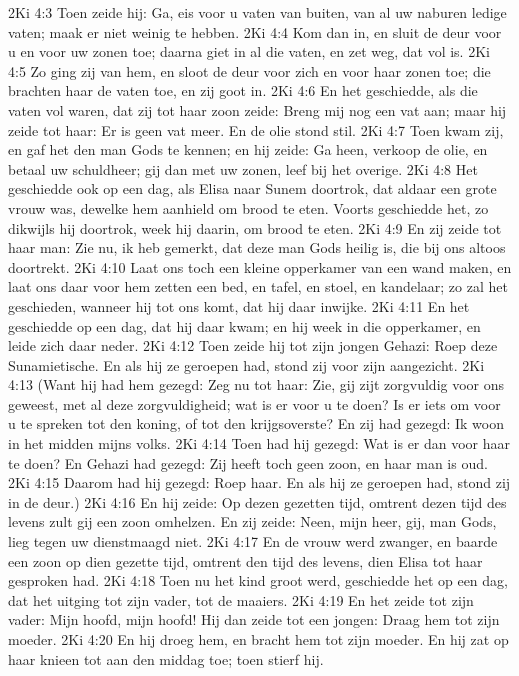 2Ki 4:3  Toen zeide hij: Ga, eis voor u vaten van buiten, van al uw naburen ledige vaten; maak er niet weinig te hebben.
2Ki 4:4  Kom dan in, en sluit de deur voor u en voor uw zonen toe; daarna giet in al die vaten, en zet weg, dat vol is.
2Ki 4:5  Zo ging zij van hem, en sloot de deur voor zich en voor haar zonen toe; die brachten haar de vaten toe, en zij goot in.
2Ki 4:6  En het geschiedde, als die vaten vol waren, dat zij tot haar zoon zeide: Breng mij nog een vat aan; maar hij zeide tot haar: Er is geen vat meer. En de olie stond stil.
2Ki 4:7  Toen kwam zij, en gaf het den man Gods te kennen; en hij zeide: Ga heen, verkoop de olie, en betaal uw schuldheer; gij dan met uw zonen, leef bij het overige.
2Ki 4:8  Het geschiedde ook op een dag, als Elisa naar Sunem doortrok, dat aldaar een grote vrouw was, dewelke hem aanhield om brood te eten. Voorts geschiedde het, zo dikwijls hij doortrok, week hij daarin, om brood te eten.
2Ki 4:9  En zij zeide tot haar man: Zie nu, ik heb gemerkt, dat deze man Gods heilig is, die bij ons altoos doortrekt.
2Ki 4:10  Laat ons toch een kleine opperkamer van een wand maken, en laat ons daar voor hem zetten een bed, en tafel, en stoel, en kandelaar; zo zal het geschieden, wanneer hij tot ons komt, dat hij daar inwijke.
2Ki 4:11  En het geschiedde op een dag, dat hij daar kwam; en hij week in die opperkamer, en leide zich daar neder.
2Ki 4:12  Toen zeide hij tot zijn jongen Gehazi: Roep deze Sunamietische. En als hij ze geroepen had, stond zij voor zijn aangezicht.
2Ki 4:13  (Want hij had hem gezegd: Zeg nu tot haar: Zie, gij zijt zorgvuldig voor ons geweest, met al deze zorgvuldigheid; wat is er voor u te doen? Is er iets om voor u te spreken tot den koning, of tot den krijgsoverste? En zij had gezegd: Ik woon in het midden mijns volks.
2Ki 4:14  Toen had hij gezegd: Wat is er dan voor haar te doen? En Gehazi had gezegd: Zij heeft toch geen zoon, en haar man is oud.
2Ki 4:15  Daarom had hij gezegd: Roep haar. En als hij ze geroepen had, stond zij in de deur.)
2Ki 4:16  En hij zeide: Op dezen gezetten tijd, omtrent dezen tijd des levens zult gij een zoon omhelzen. En zij zeide: Neen, mijn heer, gij, man Gods, lieg tegen uw dienstmaagd niet.
2Ki 4:17  En de vrouw werd zwanger, en baarde een zoon op dien gezette tijd, omtrent den tijd des levens, dien Elisa tot haar gesproken had.
2Ki 4:18  Toen nu het kind groot werd, geschiedde het op een dag, dat het uitging tot zijn vader, tot de maaiers.
2Ki 4:19  En het zeide tot zijn vader: Mijn hoofd, mijn hoofd! Hij dan zeide tot een jongen: Draag hem tot zijn moeder.
2Ki 4:20  En hij droeg hem, en bracht hem tot zijn moeder. En hij zat op haar knieen tot aan den middag toe; toen stierf hij.
